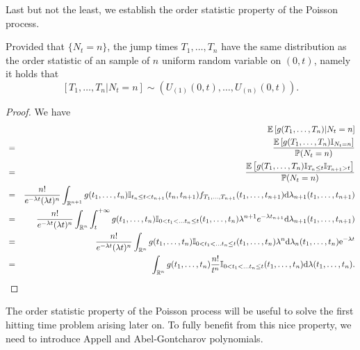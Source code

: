 Last but not the least, we establish the order statistic property of the Poisson process.
\begin{prop}
Provided that $\{N_t=n\}$, the jump times $T_1,\ldots,T_n$ have the same distribution as the order statistic of an \iid sample of $n$ uniform random variable on $(0,t)$, namely it holds that
$$
[T_1,\ldots,T_n|N_t=n]\sim \left(U_{(1)}(0,t),\ldots, U_{(n)}(0,t)\right).
$$
\end{prop}
\begin{proof}
We have
\begin{eqnarray*}
&&\mathbb{E}\left[g(T_1,\ldots, T_n)|N_t = n\right]\\
&=&\frac{\mathbb{E}\left[g(T_1,\ldots, T_n)\mathbb{I}_{N_t = n}\right]}{\mathbb{P}(N_t = n)}\\
&=&\frac{\mathbb{E}\left[g(T_1,\ldots, T_n)\mathbb{I}_{T_n \leq t}\mathbb{I}_{T_{n+1} > t}\right]}{\mathbb{P}(N_t = n)}\\
&=&\frac{n!}{e^{-\lambda t}(\lambda t)^n}\int_{\mathbb{R}^{n+1}}g(t_1,\ldots, t_n)\mathbb{I}_{t_n\leq t<t_{n+1}}(t_n,t_{n+1})f_{T_1,\ldots, T_{n+1}}(t_1,\ldots, t_{n+1})\text{d}\lambda_{n+1}(t_1,\ldots, t_{n+1})\\
&=&\frac{n!}{e^{-\lambda t}(\lambda t)^n}\int_{\mathbb{R}^{n}}\int_{t}^{+\infty}g(t_1,\ldots, t_n)\mathbb{I}_{0<t_1<\ldots t_n\leq t}(t_1,\ldots,t_{n})\lambda^{n+1} e^{-\lambda t_{n+1}}\text{d}\lambda_{n+1}(t_1,\ldots, t_{n+1})\\
&=&\frac{n!}{e^{-\lambda t}(\lambda t)^n}\int_{\mathbb{R}^{n}}g(t_1,\ldots, t_n)\mathbb{I}_{0<t_1<\ldots t_n\leq t}(t_1,\ldots,t_{n})\lambda^{n} \text{d}\lambda_{n}(t_1,\ldots,t_n)\mathrm{e}^{-\lambda t}\\
&=&\int_{\mathbb{R}^{n}}g(t_1,\ldots, t_n)\frac{n!}{t^n}\mathbb{I}_{0<t_1<\ldots t_n\leq t}(t_1,\ldots,t_{n})\text{d}\lambda(t_1,\ldots,t_{n} ).
\end{eqnarray*}
\end{proof}
\noindent The order statistic property of the Poisson process will be useful to solve the first hitting time problem arising later on. To fully benefit from this nice property, we need to introduce Appell and Abel-Gontcharov polynomials.\\

